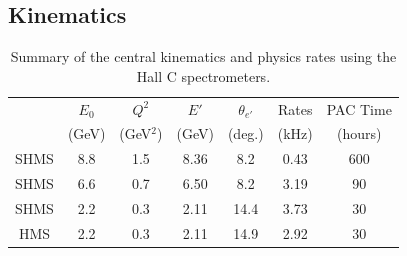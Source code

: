 \subsection{Kinematics}
\begin{table}
\begin{center}

\begin{tabular}{c|c|c|c|c|c|c}
& $E_0$ & $Q^2$    	& $E'$  &    $\theta_{e'}$  &  Rates   & PAC Time   \\
& (GeV) & (GeV$^2$)  & (GeV)  &     (deg.)   &   (kHz)  & (hours) \\
\hline\hline
SHMS & 8.8	&  1.5	&  8.36	&    8.2 	&    0.43	&   600 \\
SHMS & 6.6	&  0.7	&  6.50	&    8.2 	&    3.19	&   90 \\
SHMS & 2.2	&  0.3	&  2.11	&    14.4 	&    3.73	&   30 \\
HMS  & 2.2	&  0.3	&  2.11	&    14.9	&    2.92	&   30 \\  

\hline\hline
\end{tabular}
\caption{\label{RATES1}Summary of the central kinematics and physics rates using the Hall C  spectrometers.}
\end{center}
\end{table}


